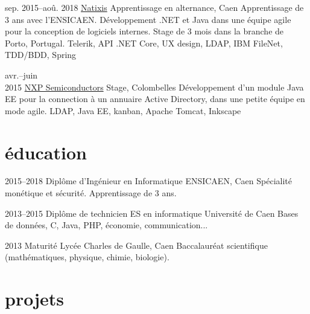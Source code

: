 \documentclass[]{friggeri-cv}
\begin{document}
\begin{entrylist}
	\entry
	{sep. 2015--aoû. 2018}
	{\href{https://www.natixis.com}{Natixis}}
	{Apprentissage en alternance, Caen}
	{Apprentissage de 3 ans avec l’ENSICAEN. Développement \csharp .NET et Java dans une équipe agile pour la conception de logiciels internes. Stage de 3 mois dans la branche de Porto, Portugal.}
	{Telerik, API .NET Core, UX design, LDAP, IBM FileNet, TDD/BDD, Spring}
	
	\entry
	{avr.--juin\\2015}
	{\href{https://www.nxp.com}{NXP Semiconductors}}
	{Stage, Colombelles}
	{Développement d’un module Java EE pour la connection à un annuaire Active Directory, dans une petite équipe en mode agile.}
	{LDAP, Java EE, kanban, Apache Tomcat, Inkscape}
\end{entrylist}

\section{éducation}

\begin{entrylist}
    \entry
    {2015--2018}
    {Diplôme d’Ingénieur {\normalfont en Informatique}}
    {ENSICAEN, Caen}
    {Spécialité monétique et sécurité. Apprentissage de 3 ans.}{}
    
    \entry
    {2013--2015}
    {Diplôme de technicien ES {\normalfont en informatique}}
    {Université de Caen}
    {Bases de données, C, Java, PHP, économie, communication...}{}
    
    \entry
    {2013}
    {Maturité}
    {Lycée Charles de Gaulle, Caen}
    {Baccalauréat scientifique (mathématiques, physique, chimie, biologie).}{}
\end{entrylist}

\section{projets}
\end{document}

